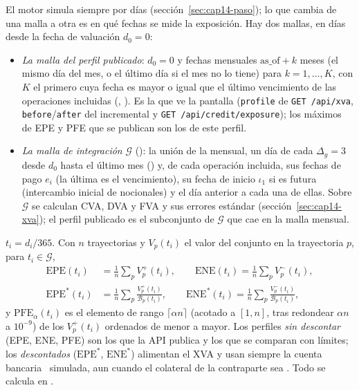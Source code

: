 \begin{sloppypar}
El motor simula siempre por días (sección~\ref{sec:cap14-paso}); lo que cambia de una malla a otra es en qué fechas
se mide la exposición. Hay dos mallas, en días desde la fecha de valuación $d_0=0$:
\begin{itemize}
  \item \emph{La malla del perfil publicado}: $d_0=0$ y fechas mensuales $\text{as\_of}+k$ meses (el mismo día del mes,
        o el último día si el mes no lo tiene) para $k=1,\dots,K$, con $K$ el primero cuya fecha es mayor o igual que el
        último vencimiento de las operaciones incluidas (,
        ). Es la que ve la pantalla (\texttt{profile} de \texttt{GET /api/xva},
        \texttt{before}/\texttt{after} del incremental y \texttt{GET /api/credit/exposure}); los máximos de EPE y PFE que
        se publican son los de este perfil.
  \item \emph{La malla de integración} $\mathcal G$ (): la unión de la
        mensual, un día de cada $\Delta_g=3$ desde $d_0$ hasta el último mes
        () y, de cada operación incluida, sus fechas de pago $e_i$ (la
        última es el vencimiento), su fecha de inicio $\iota_1$ si es futura (intercambio inicial de nocionales) y el
        día anterior a cada una de ellas. Sobre $\mathcal G$ se calculan CVA, DVA y FVA y sus errores estándar
        (sección~\ref{sec:cap14-xva}); el perfil publicado es el subconjunto de $\mathcal G$ que cae en la malla mensual.
\end{itemize}
$t_i=d_i/365$. Con $n$ trayectorias y $V_p(t_i)$ el valor del conjunto en la trayectoria $p$, para $t_i\in\mathcal G$,
\begin{equation}\label{eq:cap14-perfiles}
\begin{aligned}
  \mathrm{EPE}(t_i)&=\tfrac1n\sum_p V_p^+(t_i),\qquad \mathrm{ENE}(t_i)=\tfrac1n\sum_p V_p^-(t_i),\\
  \mathrm{EPE}^*(t_i)&=\tfrac1n\sum_p \frac{V_p^+(t_i)}{\mathcal B_p(t_i)},\qquad
  \mathrm{ENE}^*(t_i)=\tfrac1n\sum_p \frac{V_p^-(t_i)}{\mathcal B_p(t_i)},
\end{aligned}
\end{equation}
y $\mathrm{PFE}_\alpha(t_i)$ es el elemento de rango $\lceil\alpha n\rceil$ (acotado a $[1,n]$, tras redondear
$\alpha n$ a $10^{-9}$) de los $V_p^+(t_i)$ ordenados de menor a mayor. Los perfiles \emph{sin descontar}
(EPE, ENE, PFE) son los que la API publica y los que se comparan con límites; los \emph{descontados} ($\mathrm{EPE}^*$, $\mathrm{ENE}^*$) alimentan
el XVA y usan siempre la cuenta bancaria \cTIIE\ simulada, aun cuando el colateral de la contraparte sea \USD.
Todo se calcula en .


\end{sloppypar}
